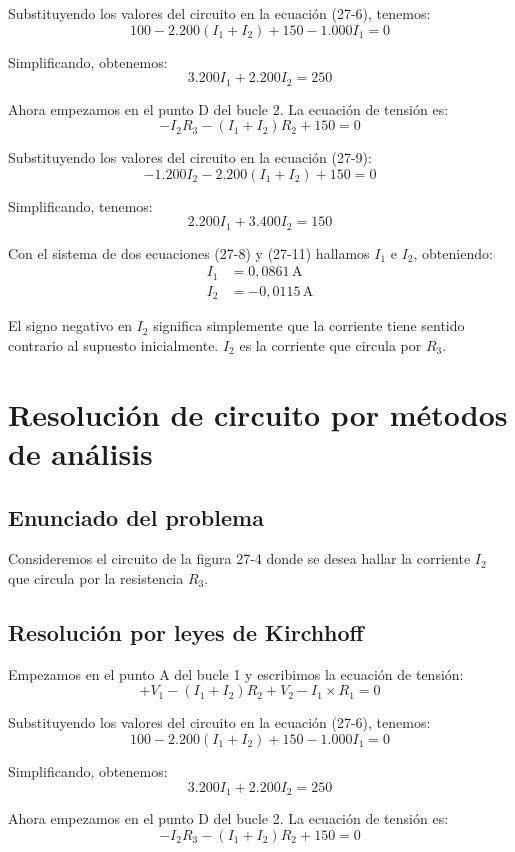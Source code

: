 Substituyendo los valores del circuito en la ecuación (27-6), tenemos:
\[
100 - 2.200(I_1 + I_2) + 150 - 1.000I_1 = 0
\tag{27-7}
\]

Simplificando, obtenemos:
\[
3.200I_1 + 2.200I_2 = 250
\tag{27-8}
\]

Ahora empezamos en el punto D del bucle 2. La ecuación de tensión es:
\[
- I_2R_3 - (I_1 + I_2)R_2 + 150 = 0
\tag{27-9}
\]

Substituyendo los valores del circuito en la ecuación (27-9):
\[
- 1.200I_2 - 2.200(I_1 + I_2) + 150 = 0
\tag{27-10}
\]

Simplificando, tenemos:
\[
2.200I_1 + 3.400I_2 = 150
\tag{27-11}
\]

Con el sistema de dos ecuaciones (27-8) y (27-11) hallamos $I_1$ e $I_2$, obteniendo:
\[
\begin{aligned}
I_1 &= 0,0861 \, \text{A} \\
I_2 &= -0,0115 \, \text{A}
\end{aligned}
\]  

\noindent El signo negativo en $I_2$ significa simplemente que la corriente tiene sentido contrario al supuesto inicialmente. $I_2$ es la corriente que circula por $R_3$.

\section*{Resolución de circuito por métodos de análisis}

\subsection{Enunciado del problema}
Consideremos el circuito de la figura 27-4 donde se desea hallar la corriente $I_2$ que circula por la resistencia $R_3$.

\subsection{Resolución por leyes de Kirchhoff}
Empezamos en el punto A del bucle 1 y escribimos la ecuación de tensión:
\[
+ V_1 - (I_1 + I_2)R_2 + V_2 - I_1 \times R_1 = 0
\tag{27-6}
\]

Substituyendo los valores del circuito en la ecuación (27-6), tenemos:
\[
100 - 2.200(I_1 + I_2) + 150 - 1.000I_1 = 0
\tag{27-7}
\]

Simplificando, obtenemos:
\[
3.200I_1 + 2.200I_2 = 250
\tag{27-8}
\]

Ahora empezamos en el punto D del bucle 2. La ecuación de tensión es:
\[
- I_2R_3 - (I_1 + I_2)R_2 + 150 = 0
\tag{27-9}
\]

